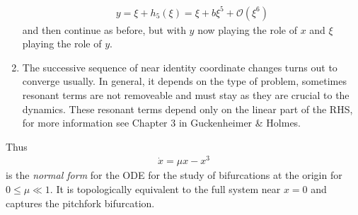 \begin{ex}
\begin{enumerate}
	\begin{align}
		y = \xi + h_5(\xi) = \xi + b \xi^5 + \mathcal{O}(\xi^6)
	\end{align}
	and then continue as before, but with $y$ now playing the role of $x$ and $\xi$ playing the role of $y$.
\item The successive sequence of near identity coordinate changes turns out to converge usually. In general, it depends on the type of problem, sometimes resonant terms are not removeable and must stay as they are crucial to the dynamics. These resonant terms depend only on the linear part of the RHS, for more information see Chapter 3 in Guckenheimer \& Holmes.
	\end{enumerate}
Thus 
\begin{align}
	\boxed{
\dot{x} = \mu x - x^3	
}
\end{align}
is the \emph{normal form} for the ODE for the study of bifurcations at the origin for $0 \leq \mu \ll 1$. It is topologically equivalent to the full system near $x=0$ and captures the pitchfork bifurcation.
\end{ex}

